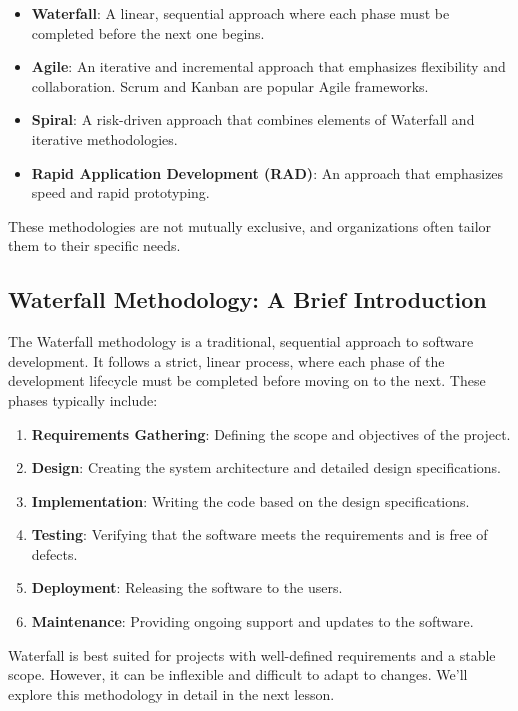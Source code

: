 \begin{itemize}
  \item \textbf{Waterfall}: A linear, sequential approach where each phase must be completed before the next one begins.
  \item \textbf{Agile}: An iterative and incremental approach that emphasizes flexibility and collaboration. Scrum and Kanban are popular Agile frameworks.
  \item \textbf{Spiral}: A risk-driven approach that combines elements of Waterfall and iterative methodologies.
  \item \textbf{Rapid Application Development (RAD)}: An approach that emphasizes speed and rapid prototyping.
\end{itemize}

These methodologies are not mutually exclusive, and organizations often tailor
them to their specific needs.

\subsection{Waterfall Methodology: A Brief Introduction}

The Waterfall methodology is a traditional, sequential approach to software
development. It follows a strict, linear process, where each phase of the
development lifecycle must be completed before moving on to the next. These
phases typically include:

\begin{enumerate}
  \item \textbf{Requirements Gathering}: Defining the scope and objectives of the project.
  \item \textbf{Design}: Creating the system architecture and detailed design specifications.
  \item \textbf{Implementation}: Writing the code based on the design specifications.
  \item \textbf{Testing}: Verifying that the software meets the requirements and is free of defects.
  \item \textbf{Deployment}: Releasing the software to the users.
  \item \textbf{Maintenance}: Providing ongoing support and updates to the software.
\end{enumerate}

Waterfall is best suited for projects with well-defined requirements and a
stable scope. However, it can be inflexible and difficult to adapt to changes.
We'll explore this methodology in detail in the next lesson.

